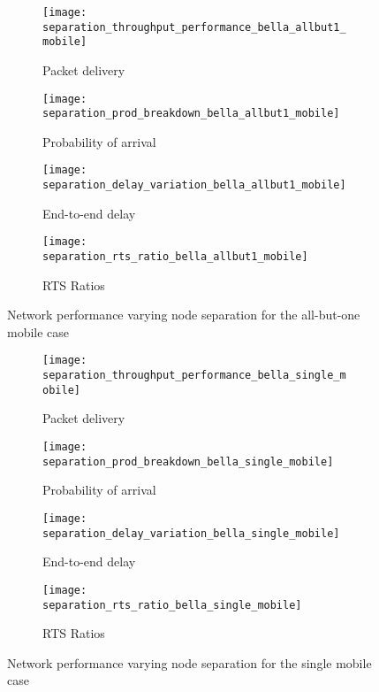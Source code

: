 \begin{figure}[tp!]
  \begin{subfigure}[t]{0.5\textwidth}
    \centering
    \texttt{[image: separation\_throughput\_performance\_bella\_allbut1\_mobile]}
    \caption{Packet delivery}
    \label{fig:separation_throughput_performance_bella_allbut1_mobile}
  \end{subfigure}
  \begin{subfigure}[t]{0.5\textwidth}
    \centering
    \texttt{[image: separation\_prod\_breakdown\_bella\_allbut1\_mobile]}
    \caption{Probability of arrival}
    \label{fig:separation_prod_breakdown_bella_allbut1_mobile}
  \end{subfigure}

  \begin{subfigure}[t]{0.5\textwidth}
    \centering
    \texttt{[image: separation\_delay\_variation\_bella\_allbut1\_mobile]}
    \caption{End-to-end delay}
    \label{fig:separation_delay_variation_bella_allbut1_mobile}
  \end{subfigure}
  \begin{subfigure}[t]{0.5\textwidth}
    \centering
    \texttt{[image: separation\_rts\_ratio\_bella\_allbut1\_mobile]}
    \caption{RTS Ratios}
    \label{fig:separation_rts_ratio_bella_allbut1_mobile}
  \end{subfigure}
  \caption{Network performance varying node separation for the all-but-one mobile case}
  \label{fig:separation_bella_allbut1_mobile}
\end{figure}

\begin{figure}[bp!]
  \begin{subfigure}[t]{0.5\textwidth}
    \centering
    \texttt{[image: separation\_throughput\_performance\_bella\_single\_mobile]}
    \caption{Packet delivery}
    \label{fig:separation_throughput_performance_bella_single_mobile}
  \end{subfigure}
  \begin{subfigure}[t]{0.5\textwidth}
    \centering
    \texttt{[image: separation\_prod\_breakdown\_bella\_single\_mobile]}
    \caption{Probability of arrival}
    \label{fig:separation_prod_breakdown_bella_single_mobile}
  \end{subfigure}

  \begin{subfigure}[t]{0.5\textwidth}
    \centering
    \texttt{[image: separation\_delay\_variation\_bella\_single\_mobile]}
    \caption{End-to-end delay}
    \label{fig:separation_delay_variation_bella_single_mobile}
  \end{subfigure}
  \begin{subfigure}[t]{0.5\textwidth}
    \centering
    \texttt{[image: separation\_rts\_ratio\_bella\_single\_mobile]}
    \caption{RTS Ratios}
    \label{fig:separation_rts_ratio_bella_single_mobile}
  \end{subfigure}
  \caption{Network performance varying node separation for the single mobile case}
  \label{fig:separation_bella_single_mobile}
\end{figure}


